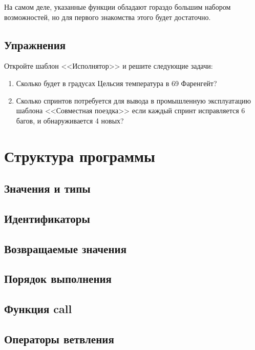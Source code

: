 \documentclass[10pt]{book}
\begin{document}
	На самом деле, указанные функции обладают гораздо большим набором возможностей, но для первого знакомства этого будет достаточно. 
				
	\section{Упражнения}
	
	Откройте шаблон <<Исполнятор>> и решите следующие задачи:
	
	\begin{enumerate}
		\item Сколько будет в градусах Цельсия температура в 69 Фаренгейт?
		
		\item Сколько спринтов потребуется для вывода в промышленную эксплуатацию шаблона <<Совместная поездка>> если каждый спринт исправляется 6 багов, и обнаруживается 4 новых?
	\end{enumerate}
	
	
	\chapter{Структура программы}
	
	\section{Значения и типы}
	
	\section{Идентификаторы}
	
	\section{Возвращаемые значения}
	
	\section{Порядок выполнения}
	
	\section{Функция call}
	
	\section{Операторы ветвления}
	
\end{document}
